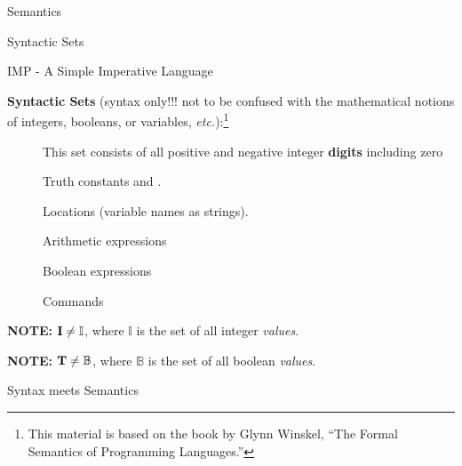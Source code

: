 \documentclass{beamer}
\begin{document}
\begin{frame}{Semantics}
\begin{frame}{Syntactic Sets}
\end{frame}


\begin{frame}{IMP - A Simple Imperative Language}

{\bf Syntactic Sets} (syntax only!!! not to be confused with the mathematical notions of integers, booleans, or variables, {\it etc.}):\footnote{This material is based on the book by Glynn Winskel, ``The Formal Semantics
of Programming Languages.''}
\begin{description}
\item[] This set consists of all positive and negative integer {\bf digits} including zero
\item[] Truth constants  and .
\item[] Locations (variable names as strings).
\item[] Arithmetic expressions
\item[] Boolean expressions
\item[] Commands
\end{description}

{\bf NOTE:} $\mbox{\bf I} \ne \mathbb{I}$, where $\mathbb{I}$ is the set of all integer {\em values}.

{\bf NOTE:} $\mbox{\bf T} \ne \mathbb{B}$, where $\mathbb{B}$ is the set of all boolean {\em values}.

\end{frame}


\begin{frame}{Syntax meets Semantics}
\scriptsize


\end{frame}
\end{frame}
\end{document}
